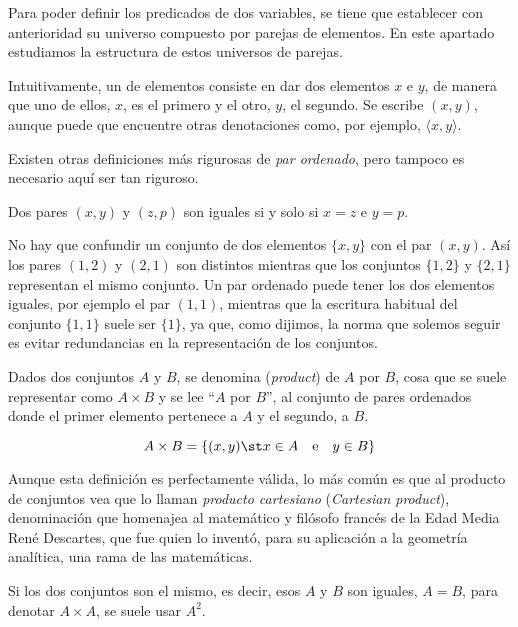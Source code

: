 



Para poder definir los predicados de dos variables, se tiene que establecer
con anterioridad su universo compuesto por parejas de elementos. En este
apartado estudiamos la estructura de estos universos de parejas.

Intuitivamente, un  de elementos consiste en dar dos
elementos $x$ e $y$, de manera que uno de ellos, $x$, es el primero y el
otro, $y$, el segundo. Se escribe $(x, y)$, aunque puede que encuentre otras
denotaciones como, por ejemplo, $\langle x, y\rangle$.


Existen otras definiciones más rigurosas de \emph{par ordenado}, pero
tampoco es necesario aquí ser tan riguroso.

Dos pares $(x, y)$ y $(z, p)$ son iguales si y solo si $x = z$ e $y = p$.

No hay que confundir un conjunto de dos elementos $\{x, y\}$ con el par $(x,
y)$. Así los pares $(1, 2)$ y $(2, 1)$ son distintos mientras que los
conjuntos $\{1, 2\}$ y $\{2, 1\}$ representan el mismo conjunto. Un par
ordenado puede tener los dos elementos iguales, por ejemplo el par $(1, 1)$,
mientras que la escritura habitual del conjunto $\{1, 1\}$ suele ser
$\{1\}$, ya que, como dijimos, la norma que solemos seguir es evitar
redundancias en la representación de los conjuntos.

Dados dos conjuntos $A$ y $B$, se denomina  (\emph{product})
de $A$ por $B$, cosa que se suele representar como $A \times B$ y se lee
``$A$ por $B$'', al conjunto de pares ordenados donde el primer elemento
pertenece a $A$ y el segundo, a $B$.

\[ A \times B = \{(x, y) \st x \in A \quad \text{e} \quad y \in B\} \]

Aunque esta definición es perfectamente válida, lo más común es que al
producto de conjuntos vea que lo llaman \emph{producto cartesiano}
(\emph{Cartesian product}), denominación que homenajea al matemático y
filósofo francés de la Edad Media René Descartes, que fue quien lo inventó,
para su aplicación a la geometría analítica, una rama de las matemáticas.

Si los dos conjuntos son el mismo, es decir, esos $A$ y $B$ son iguales, $A
= B$, para denotar $A \times A$, se suele usar $A^2$.


